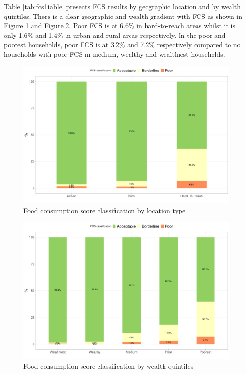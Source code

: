 \documentclass[12pt,a4paper]{article}
\begin{document}
Table \ref{tab:fcs1table} presents FCS results by geographic location and by wealth quintiles. There is a clear geographic and wealth gradient with FCS as shown in Figure \ref{fig:fcs1plot} and Figure \ref{fig:fcs2plot}. Poor FCS is at 6.6\% in hard-to-reach areas whilst it is only 1.6\% and 1.4\% in urban and rural areas respectively. In the poor and poorest households, poor FCS is at 3.2\% and 7.2\% respectively compared to no households with poor FCS in medium, wealthy and wealthiest households.

\newpage

\begin{figure}[H]

{\centering \includegraphics{kayinReport_files/figure-latex/fcs1plot-1} 

}

\caption{Food consumption score classification by location type}\label{fig:fcs1plot}
\end{figure}

\begin{figure}[H]

{\centering \includegraphics{kayinReport_files/figure-latex/fcs2plot-1} 

}

\caption{Food consumption score classification by wealth quintiles}\label{fig:fcs2plot}
\end{figure}
\end{document}
